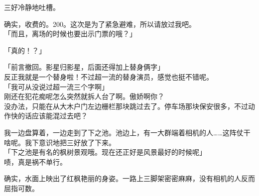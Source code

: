 三好冷静地吐槽。

确实，收费的。200。这次是为了紧急避难，所以请放过我吧。\\

「而且，离场的时候也要出示门票的哦？」

「真的！？」

「前言撤回。影星归影星，后面还得加上替身俩字」\\

反正我就是一个替身啦！不过超一流的替身演员，感觉也挺不错呢。\\

「我可从没说过超一流三个字啊」\\

刚还在犯花痴呢怎么突然就拆人台了啊。傲娇啊你？\\

没办法，只能在从大木户门左边栅栏那块跳过去了。停车场那块保安很多，不过动作快的话应该能混过去吧？

我一边盘算着，一边走到了下之池。池边上，有一大群端着相机的人……这阵仗干啥呢。我下意识地把三好放了下来。\\

「下之池是有名的枫树景观哦。现在还正好是风景最好的时候呢」\\

啧，真是祸不单行。

确实，水面上映出了红枫艳丽的身姿。一路上三脚架密密麻麻，没有相机的人反而屈指可数。\\

